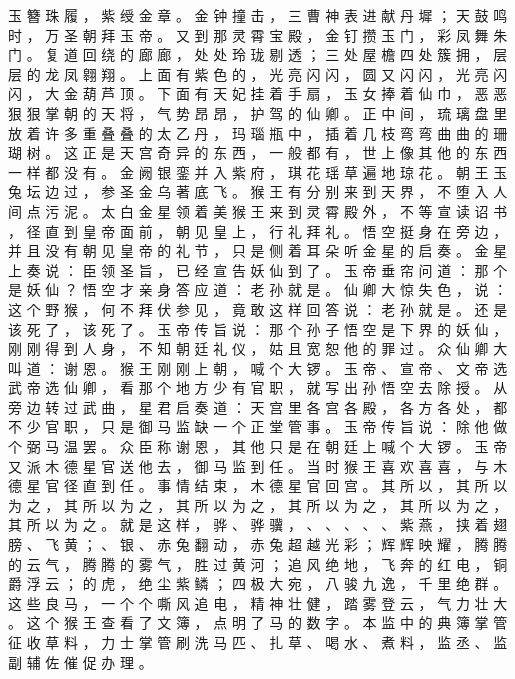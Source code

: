 {玉 簪 珠 履 ， 紫 绶 金 章 。
金 钟 撞 击 ， 三 曹 神 表 进 献 丹 墀 ； 天 鼓 鸣 时 ， 万 圣 朝 拜 玉 帝 。
又 到 那 灵 霄 宝 殿 ， 金 钉 攒 玉 门 ， 彩 凤 舞 朱 门 。
复 道 回 绕 的 廊 廊 ， 处 处 玲 珑 剔 透 ； 三 处 屋 檐 四 处 簇 拥 ， 层 层 的 龙 凤 翱 翔 。
上 面 有 紫 色 的 ， 光 亮 闪 闪 ， 圆 又 闪 闪 ， 光 亮 闪 闪 ， 大 金 葫 芦 顶 。
下 面 有 天 妃 挂 着 手 扇 ， 玉 女 捧 着 仙 巾 ， 恶 恶 狠 狠 掌 朝 的 天 将 ， 气 势 昂 昂 ， 护 驾 的 仙 卿 。
正 中 间 ， 琉 璃 盘 里 放 着 许 多 重 叠 叠 的 太 乙 丹 ， 玛 瑙 瓶 中 ， 插 着 几 枝 弯 弯 曲 曲 的 珊 瑚 树 。
这 正 是 天 宫 奇 异 的 东 西 ， 一 般 都 有 ， 世 上 像 其 他 的 东 西 一 样 都 没 有 。
金 阙 银 銮 并 入 紫 府 ， 琪 花 瑶 草 遍 地 琼 花 。
朝 王 玉 兔 坛 边 过 ， 参 圣 金 乌 著 底 飞 。
猴 王 有 分 别 来 到 天 界 ， 不 堕 入 人 间 点 污 泥 。
太 白 金 星 领 着 美 猴 王 来 到 灵 霄 殿 外 ， 不 等 宣 读 诏 书 ， 径 直 到 皇 帝 面 前 ， 朝 见 皇 上 ， 行 礼 拜 礼 。
悟 空 挺 身 在 旁 边 ， 并 且 没 有 朝 见 皇 帝 的 礼 节 ， 只 是 侧 着 耳 朵 听 金 星 的 启 奏 。
金 星 上 奏 说 ： 臣 领 圣 旨 ， 已 经 宣 告 妖 仙 到 了 。
玉 帝 垂 帘 问 道 ： 那 个 是 妖 仙 ？ 悟 空 才 亲 身 答 应 道 ： 老 孙 就 是 。
仙 卿 大 惊 失 色 ， 说 ： 这 个 野 猴 ， 何 不 拜 伏 参 见 ， 竟 敢 这 样 回 答 说 ： 老 孙 就 是 。
还 是 该 死 了 ， 该 死 了 。
玉 帝 传 旨 说 ： 那 个 孙 子 悟 空 是 下 界 的 妖 仙 ， 刚 刚 得 到 人 身 ， 不 知 朝 廷 礼 仪 ， 姑 且 宽 恕 他 的 罪 过 。
众 仙 卿 大 叫 道 ： 谢 恩 。
猴 王 刚 刚 上 朝 ， 喊 个 大 锣 。
玉 帝 、 宣 帝 、 文 帝 选 武 帝 选 仙 卿 ， 看 那 个 地 方 少 有 官 职 ， 就 写 出 孙 悟 空 去 除 授 。
从 旁 边 转 过 武 曲 ， 星 君 启 奏 道 ： 天 宫 里 各 宫 各 殿 ， 各 方 各 处 ， 都 不 少 官 职 ， 只 是 御 马 监 缺 一 个 正 堂 管 事 。
玉 帝 传 旨 说 ： 除 他 做 个 弼 马 温 罢 。
众 臣 称 谢 恩 ， 其 他 只 是 在 朝 廷 上 喊 个 大 锣 。
玉 帝 又 派 木 德 星 官 送 他 去 ， 御 马 监 到 任 。
当 时 猴 王 喜 欢 喜 喜 ， 与 木 德 星 官 径 直 到 任 。
事 情 结 束 ， 木 德 星 官 回 宫 。
其 所 以 ， 其 所 以 为 之 ， 其 所 以 为 之 ， 其 所 以 为 之 ， 其 所 以 为 之 ， 其 所 以 为 之 ， 其 所 以 为 之 。
就 是 这 样 ， 骅 、 骅 骥 ， 、 、 、 、 、 紫 燕 ， 挟 着 翅 膀 、 飞 黄 ； 、 银 、 赤 兔 翻 动 ， 赤 兔 超 越 光 彩 ； 辉 辉 映 耀 ， 腾 腾 的 云 气 ， 腾 腾 的 雾 气 ， 胜 过 黄 河 ； 追 风 绝 地 ， 飞 奔 的 红 电 ， 铜 爵 浮 云 ； 的 虎 ， 绝 尘 紫 鳞 ； 四 极 大 宛 ， 八 骏 九 逸 ， 千 里 绝 群 。
这 些 良 马 ， 一 个 个 嘶 风 追 电 ， 精 神 壮 健 ， 踏 雾 登 云 ， 气 力 壮 大 。
这 个 猴 王 查 看 了 文 簿 ， 点 明 了 马 的 数 字 。
本 监 中 的 典 簿 掌 管 征 收 草 料 ， 力 士 掌 管 刷 洗 马 匹 、 扎 草 、 喝 水 、 煮 料 ， 监 丞 、 监 副 辅 佐 催 促 办 理 。
}
